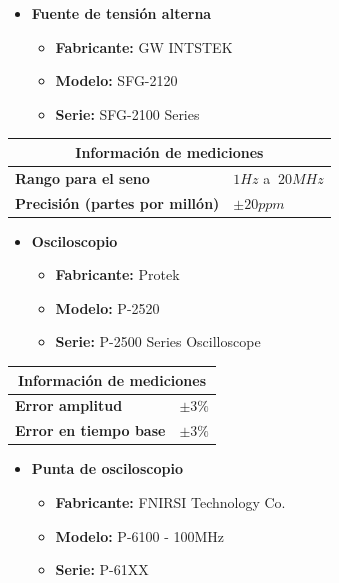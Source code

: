 \begin{itemize}
\item \textbf{Fuente de tensión alterna}
\begin{itemize}
\item \textbf{Fabricante:} GW INTSTEK
\item \textbf{Modelo:} SFG-2120
\item \textbf{Serie:} SFG-2100 Series
\end{itemize}
\end{itemize}


\begin{center}
\renewcommand{\arraystretch}{1.2}
\begin{tabular}{| m{4cm}| m{3cm} |}
\hline
\multicolumn{2}{|c|}{\textbf{Información de mediciones}} \\
\hline
\textbf{Rango para el seno} & $1Hz$ a $~20MHz$ \\
\hline
\textbf{Precisión (partes por millón)} & $\pm 20ppm$ \\
\hline
\end{tabular}
\end{center}

\begin{itemize}
\item \textbf{Osciloscopio}
\begin{itemize}
\item \textbf{Fabricante:} Protek
\item \textbf{Modelo:} P-2520
\item \textbf{Serie:} P-2500 Series Oscilloscope
\end{itemize}
\end{itemize}


\begin{center}
\renewcommand{\arraystretch}{1.2}
\begin{tabular}{| m{4cm}| m{3cm} |}
\hline
\multicolumn{2}{|c|}{\textbf{Información de mediciones}} \\
\hline
\textbf{Error amplitud} & $\pm 3\%$ \\
\hline
\textbf{Error en tiempo base} & $\pm 3\%$ \\
\hline
\end{tabular}
\end{center}

\newpage

\begin{itemize}
\item \textbf{Punta de osciloscopio}
\begin{itemize}
\item \textbf{Fabricante:} FNIRSI Technology Co.
\item \textbf{Modelo:} P-6100 - 100MHz
\item \textbf{Serie:} P-61XX
\end{itemize}
\end{itemize}

